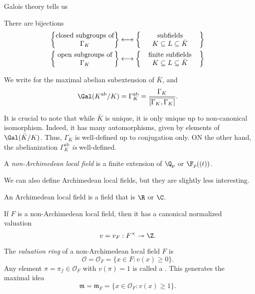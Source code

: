 \documentclass[a4paper]{article}
\newcommand\ab{\mathrm{ab}}
\begin{document}
Galois theory tells us
\begin{thm}
  There are bijections
  \begin{align*}
    \left\{\parbox{3cm}{\centering closed subgroups of $\Gamma_K$}\right\} &\longleftrightarrow \left\{\parbox{3cm}{\centering subfields $K \subseteq L \subseteq \bar{K}$}\right\}\\
    \left\{\parbox{3cm}{\centering open subgroups of $\Gamma_K$}\right\} &\longleftrightarrow \left\{\parbox{3cm}{\centering finite subfields $K \subseteq L \subseteq \bar{K}$}\right\}
  \end{align*}
\end{thm}

\begin{notation}
  We write \term{$K^{\ab}$} for the maximal abelian subextension of $\bar{K}$, and
  \[
    \Gal(K^{\ab}/K) = \Gamma_K^{\ab} = \frac{\Gamma_K}{\overline{[\Gamma_K, \Gamma_K]}}.
  \]
\end{notation}
It is crucial to note that while $\bar{K}$ is unique, it is only unique up to non-canonical isomorphism. Indeed, it has many automorphisms, given by elements of $\Gal(\bar{K}/K)$. Thus, $\Gamma_K$ is well-defined up to conjugation only. ON the other hand, the abelianization $\Gamma_K^{\ab}$ \emph{is} well-defined.

\begin{defi}
  A \emph{non-Archimedean local field} is a finite extension of $\Q_p$ or $\F_p((t))$.
\end{defi}
We can also define Archimedean local fields, but they are slightly less interesting.
\begin{defi}
  An Archimedean local field is a field that is $\R$ or $\C$.
\end{defi}

If $F$ is a non-Archimedean local field, then it has a canonical normalized valuation
\[
  v = v_F: F^\times \twoheadrightarrow \Z.
\]
\begin{defi}
  The \emph{valuation ring} of a non-Archimedean local field $F$ is
  \[
    \mathcal{O} = \mathcal{O}_F = \{x \in F : v(x) \geq 0\}.
  \]
  Any element $\pi = \pi_f \in \mathcal{O}_F$ with $v(\pi) = 1$ is called a . This generates the maximal idea
  \[
    \mathfrak{m} = \mathfrak{m}_F = \{x \in \mathcal{O}_F: v(x) \geq 1\}.
  \]
\end{defi}
\end{document}
